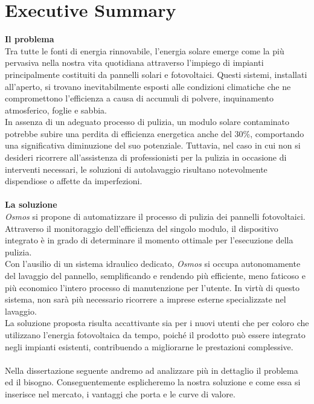 \documentclass[a4paper, 12pt]{article}
\begin{document}
	\section{Executive Summary} %
	\textbf{Il problema}\\
	Tra tutte le fonti di energia rinnovabile, l’energia solare emerge come la più pervasiva nella nostra vita quotidiana attraverso l’impiego di impianti principalmente costituiti da pannelli solari e fotovoltaici. Questi sistemi, installati all'aperto, si trovano inevitabilmente esposti alle condizioni climatiche che ne compromettono l’efficienza a causa di accumuli di polvere, inquinamento atmosferico, foglie e sabbia.\\
	In assenza di un adeguato processo di pulizia, un modulo solare contaminato potrebbe subire una perdita di efficienza energetica anche del 30\%, comportando una significativa diminuzione del suo potenziale. Tuttavia, nel caso in cui non si desideri ricorrere all'assistenza di professionisti per la pulizia in occasione di interventi necessari, le soluzioni di autolavaggio risultano notevolmente dispendiose o affette da imperfezioni.\\\\
	\textbf{La soluzione}\\
	\emph{Osmos} si propone di automatizzare il processo di pulizia dei pannelli fotovoltaici. Attraverso il
	monitoraggio dell'efficienza del singolo modulo, il dispositivo integrato è in grado di determinare il momento ottimale per l’esecuzione della pulizia.\\
	Con l’ausilio di un sistema idraulico dedicato, \emph{Osmos} si occupa autonomamente del lavaggio del pannello, semplificando e rendendo più efficiente, meno faticoso e più economico l’intero processo di manutenzione per l’utente. In virtù di questo sistema, non sarà più necessario ricorrere
	a imprese esterne specializzate nel lavaggio.\\
	La soluzione proposta risulta accattivante sia per i nuovi utenti che per coloro che utilizzano l’energia fotovoltaica da tempo, poiché il prodotto può essere integrato negli impianti esistenti, contribuendo a migliorarne le prestazioni complessive.\\\\
	Nella dissertazione seguente andremo ad analizzare più in dettaglio il problema ed il bisogno. Conseguentemente esplicheremo la nostra soluzione e come essa si inserisce nel mercato, i vantaggi che porta e le curve di valore.\\\\
\end{document}
